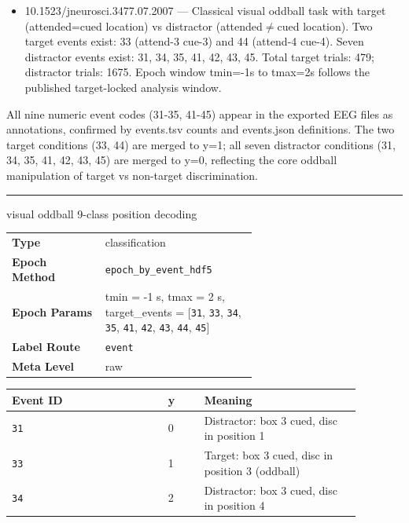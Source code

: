 {\begin{tcolorbox}
\begin{itemize}[leftmargin=1.3em,noitemsep,topsep=1pt]
\item[\scriptsize$\cdot$] {\scriptsize 10.1523/jneurosci.3477.07.2007 --- Classical visual oddball task with target (attended=cued location) vs distractor (attended$\neq$cued location). Two target events exist: 33 (attend-3 cue-3) and 44 (attend-4 cue-4). Seven distractor events exist: 31, 34, 35, 41, 42, 43, 45. Total target trials: 479; distractor trials: 1675. Epoch window tmin=-1s to tmax=2s follows the published target-locked analysis window.}
\end{itemize}
\par{} {\footnotesize All nine numeric event codes (31-35, 41-45) appear in the exported EEG files as annotations, confirmed by events.tsv counts and events.json definitions. The two target conditions (33, 44) are merged to y=1; all seven distractor conditions (31, 34, 35, 41, 42, 43, 45) are merged to y=0, reflecting the core oddball manipulation of target vs non-target discrimination.}
\noindent\rule{\linewidth}{0.4pt}\par\nopagebreak
{} {\footnotesize visual oddball 9-class position decoding}\par\smallskip
{\footnotesize\begin{tabular}{@{}lp{0.62\linewidth}@{}}
\textbf{Type} & classification \\
\textbf{Epoch Method} & \texttt{epoch\_by\_event\_hdf5} \\
\textbf{Epoch Params} & tmin = -1 s, tmax = 2 s, target\_events = [\texttt{31}, \texttt{33}, \texttt{34}, \texttt{35}, \texttt{41}, \texttt{42}, \texttt{43}, \texttt{44}, \texttt{45}] \\
\textbf{Label Route} & \texttt{event} \\
\textbf{Meta Level} & raw \\
\end{tabular}}
\par{}\par\smallskip
\begingroup\footnotesize
\begin{tabular}{@{}p{0.3911\linewidth}p{0.0978\linewidth}p{0.3911\linewidth}@{}}
\toprule
\textbf{Event ID} & \textbf{y} & \textbf{Meaning} \\
\midrule
\texttt{31} & 0 & Distractor: box 3 cued, disc in position 1 \\
\texttt{33} & 1 & Target: box 3 cued, disc in position 3 (oddball) \\
\texttt{34} & 2 & Distractor: box 3 cued, disc in position 4 \\

\end{tabular}
\end{tcolorbox}}

